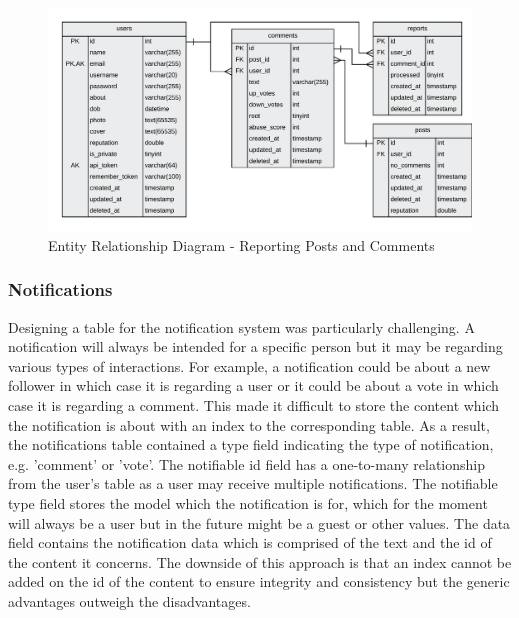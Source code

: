 \begin{figure}[H]
  \centering
  \includegraphics[width=1.0\textwidth]{Images/Design/Database/Reports}
  \caption{Entity Relationship Diagram - Reporting Posts and Comments} \label{fig:ERD_Reporting}
\end{figure}

\subsubsection{Notifications}
Designing a table for the notification system was particularly challenging. A notification will always be intended for a specific person but it may be regarding various types of interactions. For example, a notification could be about a new follower in which case it is regarding a user or it could be about a vote in which case it is regarding a comment. This made it difficult to store the content which the notification is about with an index to the corresponding table. As a result, the notifications table contained a type field indicating the type of notification, e.g. 'comment' or 'vote'. The notifiable id field has a one-to-many relationship from the user's table as a user may receive multiple notifications. The notifiable type field stores the model which the notification is for, which for the moment will always be a user but in the future might be a guest or other values. The data field contains the notification data which is comprised of the text and the id of the content it concerns. The downside of this approach is that an index cannot be added on the id of the content to ensure integrity and consistency but the generic advantages outweigh the disadvantages.

